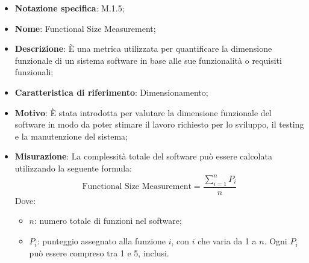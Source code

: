 \begin{itemize}
    \item \textbf{Notazione specifica}: M.1.5;
    \item \textbf{Nome}: Functional Size Measurement;
    \item \textbf{Descrizione}: È una metrica utilizzata per quantificare la dimensione funzionale di un sistema software in base alle sue funzionalità o requisiti funzionali;
    \item \textbf{Caratteristica di riferimento}: Dimensionamento;
    \item \textbf{Motivo}: È stata introdotta per valutare la dimensione funzionale del software in modo da poter stimare il lavoro richiesto per lo sviluppo, il testing e la manutenzione del sistema;
    \item \textbf{Misurazione}: La complessità totale del software può essere calcolata utilizzando la seguente formula:
    \[
    \text{Functional Size Measurement} = \frac{\sum_{i=1}^{n} P_i}{n}
    \]
    Dove:
    \begin{itemize}
        \item $n$: numero totale di funzioni nel software;
        \item $P_i$: punteggio assegnato alla funzione $i$, con $i$ che varia da 1 a $n$. Ogni $P_i$ può essere compreso tra 1 e 5, inclusi.
    \end{itemize}

\end{itemize}
